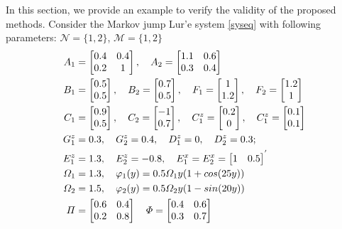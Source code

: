\documentclass[conference]{IEEEtran}
\begin{document}
In this section, we provide an example to verify the validity of the proposed methods. Consider the Markov jump Lur'e system \eqref{syseq} with following parameters: $\mathcal{N}=\{1,2\}$, $\mathcal{M}=\{1,2\}$ 
\begin{equation} \notag
	\begin{aligned}
		A_{1}&=\begin{bmatrix}
			0.4&0.4\\
			0.2&1
		\end{bmatrix}, \quad
		A_{2}=\begin{bmatrix}
			1.1&0.6\\
			0.3&0.4
		\end{bmatrix}\\     
		B_{1}&=\begin{bmatrix}
		0.5\\0.5
		\end{bmatrix}, \quad
		B_2 = \begin{bmatrix}
		0.7\\0.5
		\end{bmatrix}, \quad
		F_{1}=\begin{bmatrix}
		1\\1.2
		\end{bmatrix},\quad
		F_{2}=\begin{bmatrix}
		1.2\\1
		\end{bmatrix}
		\\
		C_{1}&=\begin{bmatrix}
		0.9\\0.5
		\end{bmatrix},\quad
		C_{2}=\begin{bmatrix}
		-1\\0.7
		\end{bmatrix},\quad
		C^{z}_{1}=\begin{bmatrix}
		0.2\\0
		\end{bmatrix},\quad
		C^{z}_{1}=\begin{bmatrix}
		0.1\\0.1
		\end{bmatrix} \\       
		G^{z}_{1}& = 0.3,\quad G^{z}_{2} = 0.4,\quad D^{z}_{1} = 0,\quad D^{z}_{2} = 0.3;\\
		E^{z}_{1}&= 1.3,\quad E^{z}_{2} = -0.8,\quad 	E^{x}_{1} = E^{x}_{2}= \begin{bmatrix} 
			1&0.5
		\end{bmatrix}^{'}\\
		\varOmega_{1}&=1.3, \quad \varphi_{1}(y)=0.5\varOmega_{1}y(1+cos(25y)) \\ 
		\varOmega_{2}&=1.5,\quad \varphi_{2}(y)=0.5\varOmega_{2}y(1-sin(20y)) \\
		\varPi&=\begin{bmatrix}
			0.6&0.4\\
			0.2&0.8
		\end{bmatrix} \quad
		\varPhi=\begin{bmatrix}
			0.4&0.6\\
			0.3&0.7
		\end{bmatrix}
	\end{aligned}  
\end{equation}
\end{document}
